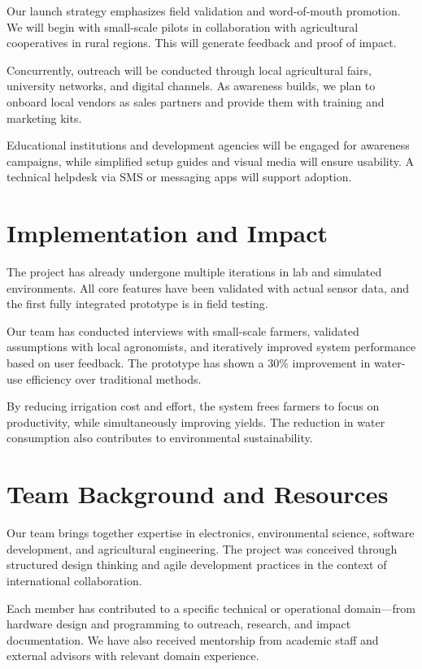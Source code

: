 \documentclass{IEEEtran}
\begin{document}
Our launch strategy emphasizes field validation and word-of-mouth promotion. We will begin with small-scale pilots in collaboration with agricultural cooperatives in rural regions. This will generate feedback and proof of impact.

Concurrently, outreach will be conducted through local agricultural fairs, university networks, and digital channels. As awareness builds, we plan to onboard local vendors as sales partners and provide them with training and marketing kits.

Educational institutions and development agencies will be engaged for awareness campaigns, while simplified setup guides and visual media will ensure usability. A technical helpdesk via SMS or messaging apps will support adoption.

\section{Implementation and Impact}
The project has already undergone multiple iterations in lab and simulated environments. All core features have been validated with actual sensor data, and the first fully integrated prototype is in field testing.

Our team has conducted interviews with small-scale farmers, validated assumptions with local agronomists, and iteratively improved system performance based on user feedback. The prototype has shown a 30\% improvement in water-use efficiency over traditional methods.

By reducing irrigation cost and effort, the system frees farmers to focus on productivity, while simultaneously improving yields. The reduction in water consumption also contributes to environmental sustainability.

\section{Team Background and Resources}

Our team brings together expertise in electronics, environmental science, software development, and agricultural engineering. The project was conceived through structured design thinking and agile development practices in the context of international collaboration.

Each member has contributed to a specific technical or operational domain—from hardware design and programming to outreach, research, and impact documentation. We have also received mentorship from academic staff and external advisors with relevant domain experience.
\end{document}
